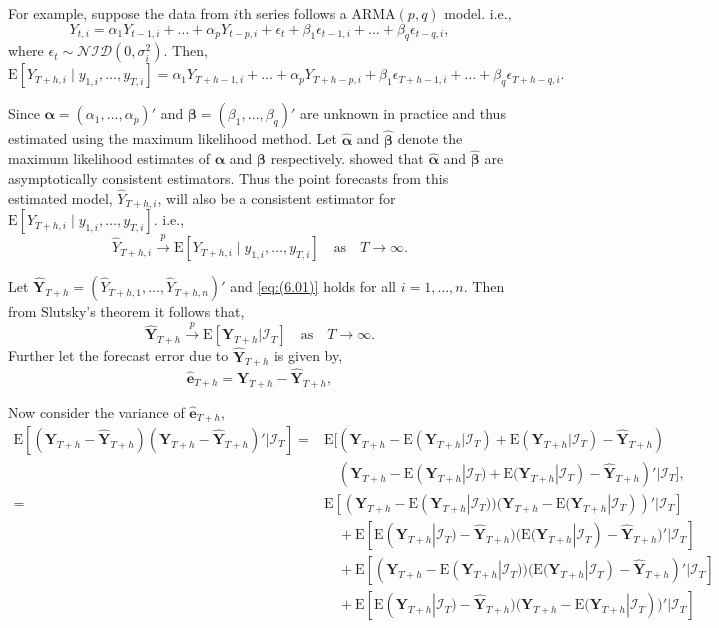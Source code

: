 \documentclass[a4paper, 11pt]{article}
\def\E{\text{E}}
\begin{document}
	For example, suppose the data from $i$th series follows a ARMA$(p,q)$ model. i.e.,
	$$
	Y_{t,i}=\alpha_1Y_{t-1,i}+\dots+\alpha_pY_{t-p,i}+\epsilon_t + \beta_1\epsilon_{t-1,i}+\dots+\beta_q\epsilon_{t-q,i},
	$$
	where $\epsilon_t \sim \mathcal{NID}(0, \sigma_i^2)$. Then,
	$$
	\E[Y_{T+h,i}\mid y_{1,i},\dots,y_{T,i}] = \alpha_1Y_{T+h-1,i}+\dots+\alpha_pY_{T+h-p,i}+ \beta_1\epsilon_{T+h-1,i}+\dots+\beta_q\epsilon_{T+h-q,i}.
	$$
	
	Since $\bm{\alpha} = (\alpha_1,\dots,\alpha_p)'$ and $\bm{\beta} = (\beta_1,\dots,\beta_q)'$ are unknown in practice and thus estimated using the maximum likelihood method. Let $\bm{\hat{\alpha}}$ and $\bm{\hat{\beta}}$ denote the maximum likelihood estimates of $\bm{\alpha}$ and $\bm{\beta}$ respectively. \citet{Yao2006} showed that $\bm{\hat{\alpha}}$ and $\bm{\hat{\beta}}$ are asymptotically consistent estimators. Thus the point forecasts from this estimated model, $\hat{Y}_{T+h,i}$, will also be a consistent estimator for $\E[Y_{T+h,i}\mid y_{1,i},\dots,y_{T,i}]$. i.e.,
	\begin{equation} \label{eq:(6.01)}
	\hat{Y}_{T+h,i} \overset{p}{\to} \E[Y_{T+h,i}\mid y_{1,i},\dots,y_{T,i}] \quad \text{as} \quad T \to \infty.
	\end{equation}
	
	Let $\hat{\bm{Y}}_{T+h}=(\hat{Y}_{T+h,1},\dots,\hat{Y}_{T+h,n})'$ and \eqref{eq:(6.01)} holds for all $i=1,\dots,n$. Then from Slutsky's theorem it follows that,
	\begin{equation}\label{eq:(6.02)}
	\hat{\bm{Y}}_{T+h} \overset{p}{\to} \E[\bm{Y}_{T+h}|\bm{\mathcal{I}}_T] \quad \text{as} \quad T \to \infty.
	\end{equation}
	Further let the forecast error due to $\hat{\bm{Y}}_{T+h}$ is given by,
	\begin{equation*}
	\hat{\bm{e}}_{T+h} = \bm{Y}_{T+h}-\hat{\bm{Y}}_{T+h},
	\end{equation*}
	
	Now consider the variance of $\hat{\bm{e}}_{T+h}$,
	\begin{align*}
	\E[(\bm{Y}_{T+h} - \hat{\bm{Y}}_{T+h})(\bm{Y}_{T+h} - \hat{\bm{Y}}_{T+h})'|\bm{\mathcal{I}}_T] = &
	\E[(\bm{Y}_{T+h} - \E(\bm{Y}_{T+h}|\bm{\mathcal{I}}_T) + \E(\bm{Y}_{T+h}|\bm{\mathcal{I}}_T)- \hat{\bm{Y}}_{T+h})\\
	& \quad
	(\bm{Y}_{T+h} - \E(\bm{Y}_{T+h}|\bm{\mathcal{I}}_T) + \E(\bm{Y}_{T+h}|\bm{\mathcal{I}}_T) - \hat{\bm{Y}}_{T+h})'|\bm{\mathcal{I}}_T],\\
	= &
	\E[(\bm{Y}_{T+h} - \E(\bm{Y}_{T+h}|\bm{\mathcal{I}}_T))(\bm{Y}_{T+h} - \E(\bm{Y}_{T+h}|\bm{\mathcal{I}}_T))'|\bm{\mathcal{I}}_T]\\
	& \quad
	+ \E[\E(\bm{Y}_{T+h}|\bm{\mathcal{I}}_T) - \hat{\bm{Y}}_{T+h})(\E(\bm{Y}_{T+h}|\bm{\mathcal{I}}_T) - \hat{\bm{Y}}_{T+h})'|\bm{\mathcal{I}}_T]\\
	& \quad
	+  \E[(\bm{Y}_{T+h} - \E(\bm{Y}_{T+h}|\bm{\mathcal{I}}_T))(\E(\bm{Y}_{T+h}|\bm{\mathcal{I}}_T) - \hat{\bm{Y}}_{T+h})'|\bm{\mathcal{I}}_T]\\
	&  \quad
	+ \E[\E(\bm{Y}_{T+h}|\bm{\mathcal{I}}_T) - \hat{\bm{Y}}_{T+h})(\bm{Y}_{T+h} - \E(\bm{Y}_{T+h}|\bm{\mathcal{I}}_T))'|\bm{\mathcal{I}}_T]
	\end{align*}
	
\end{document}
